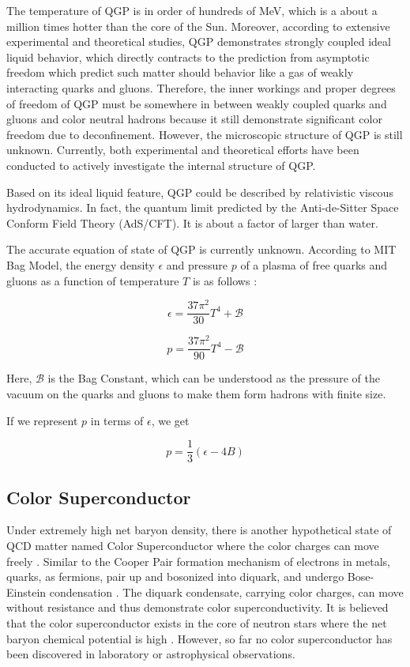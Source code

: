 The temperature of QGP is in order of hundreds of MeV, which is a about a million times hotter than the core of the Sun. Moreover, according to extensive experimental and theoretical studies, QGP demonstrates strongly coupled ideal liquid behavior, which directly contracts to the prediction from asymptotic freedom which predict such matter should behavior like a gas of weakly interacting quarks and gluons. Therefore, the inner workings and proper degrees of freedom of QGP must be somewhere in between weakly coupled quarks and gluons and color neutral hadrons because it still demonstrate significant color freedom due to deconfinement. However, the microscopic structure of QGP is still unknown. Currently, both experimental and theoretical efforts have been conducted to actively investigate the internal structure of QGP.

Based on its ideal liquid feature, QGP could be described by relativistic viscous hydrodynamics. In fact, the quantum limit predicted by the Anti-de-Sitter Space Conform Field Theory (AdS/CFT). It is about a factor of larger than water.

The accurate equation of state of QGP is currently unknown. According to MIT Bag Model, the energy density $\epsilon$ and pressure $p$ of a plasma of free quarks and gluons as a function of temperature $T$ is as follows \cite{MITBag}:

\begin{equation}
\epsilon = \frac{37 \pi^2}{30} T^4 + \mathcal{B}
\end{equation}

\begin{equation}
p = \frac{37 \pi^2}{90} T^4 - \mathcal{B}
\end{equation}

Here, $\mathcal{B}$ is the Bag Constant, which can be understood as the pressure of the vacuum on the quarks and gluons to make them form hadrons with finite size.

If we represent $p$ in terms of $\epsilon$, we get

\begin{equation}
p = \frac{1}{3} (\epsilon - 4B)
\end{equation}

\subsection{Color Superconductor}

Under extremely high net baryon density, there is another hypothetical state of QCD matter named Color Superconductor where the color charges can move freely \cite{ColorSuperconductor}. Similar to the Cooper Pair formation mechanism of electrons in metals, quarks, as fermions, pair up and bosonized into diquark, and undergo Bose-Einstein condensation \cite{ColorSuperconductor}. The diquark condensate, carrying color charges, can move without resistance and thus demonstrate color superconductivity. It is believed that the color superconductor exists in the core of neutron stars where the net baryon chemical potential is high \cite{CSCOccurrence}. However, so far no color superconductor has been discovered in laboratory or astrophysical observations. 

